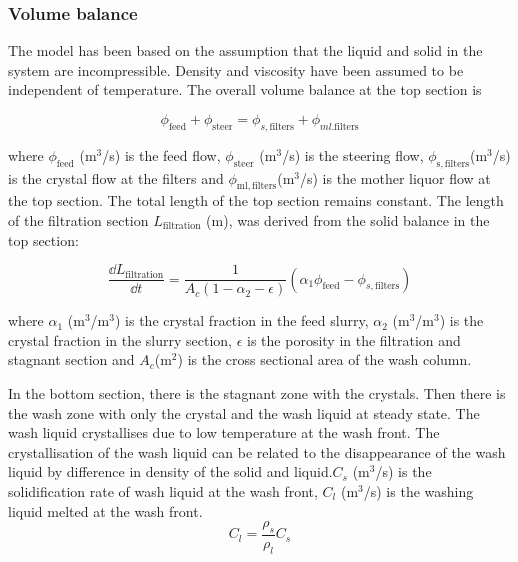 
\subsubsection{Volume balance} 
The model has been based on the assumption that the liquid and solid in the system are incompressible. Density and viscosity have been assumed to be independent of temperature. The overall volume balance at the top section is

\begin{equation}
\phi_{\mathrm{feed}}+\phi_{\mathrm{steer}}=\phi_{s,\mathrm{filters}}+\phi_{ml.\mathrm{filters}}
\end{equation}

\noindent where $\phi_{\mathrm{feed}}$ (m$^{3}$/s) is the feed flow, $\phi_{\mathrm{steer}}$ (m$^{3}$/s) is the steering flow, $\phi_{\mathrm{s,filters}} $(m$^{3}$/s) is the crystal flow at the filters and $\phi_{\mathrm{ml,filters}} $(m$^{3}$/s) is the mother liquor flow at the top section. The total length of the top section remains constant. The length of the filtration section $ L_{\mathrm{filtration}}$ (m), was derived from the solid balance in the top section: 

\begin{equation}
\frac{\dd L_{\mathrm{filtration}}}{\dd t} = \frac{1}{A_c(1-\alpha_2-\epsilon)}(\alpha_1\phi_{\mathrm{feed}}-\phi_{s,\mathrm{filters}})
\end{equation}

\noindent where $\alpha_1$ (m$^3$/m$^3$) is the crystal fraction in the feed slurry, $\alpha_2$ (m$^3$/m$^3$) is the crystal fraction in the slurry section, $\epsilon$ is the porosity in the filtration and stagnant section and $A_c $(m$^2$) is the cross sectional area of the wash column.

In the bottom section, there is the stagnant zone with the crystals. Then there is the wash zone with only the crystal and the wash liquid at steady state. The wash liquid crystallises due to low temperature at the wash front. The crystallisation of the wash liquid can be related to the disappearance of the wash liquid by difference in density of the solid and liquid.$C_s$ (m$^3$/s) is the solidification rate of wash liquid at the wash front, $C_l$ (m$^3$/s) is the washing liquid melted at the wash front. 
\begin{equation}
C_l= \frac{\rho_s}{\rho_l}C_s
\end{equation}

